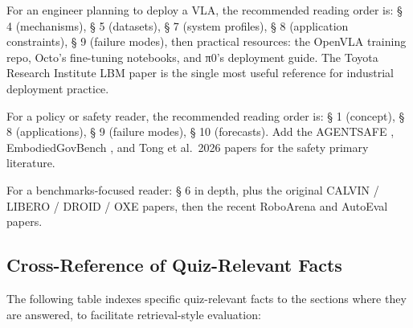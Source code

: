 \documentclass{article}
\begin{document}
For an engineer planning to deploy a VLA, the recommended reading order is: § 4 (mechanisms), § 5 (datasets), § 7 (system profiles), § 8 (application constraints), § 9 (failure modes), then practical resources: the OpenVLA training repo, Octo's fine-tuning notebooks, and π0's deployment guide. The Toyota Research Institute LBM paper \cite{barreiros2026acarefulexaminatio} is the single most useful reference for industrial deployment practice.

For a policy or safety reader, the recommended reading order is: § 1 (concept), § 8 (applications), § 9 (failure modes), § 10 (forecasts). Add the AGENTSAFE \cite{ying2025agentsafebenchmark}, EmbodiedGovBench \cite{qin2026embodiedgovbenchab}, and Tong et al.~2026 papers for the safety primary literature.

For a benchmarks-focused reader: § 6 in depth, plus the original CALVIN / LIBERO / DROID / OXE papers, then the recent RoboArena and AutoEval papers.

\subsection{Cross-Reference of Quiz-Relevant Facts}\label{cross-reference-of-quiz-relevant-facts}

The following table indexes specific quiz-relevant facts to the sections where they are answered, to facilitate retrieval-style evaluation:
\end{document}
